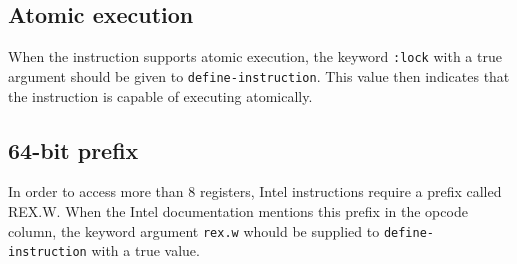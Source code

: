 \subsection{Atomic execution}

When the instruction supports atomic execution, the keyword
\texttt{:lock} with a true argument should be given to
\texttt{define-instruction}.  This value then indicates that the
instruction is capable of executing atomically.

\subsection{64-bit prefix}

In order to access more than 8 registers, Intel instructions require a
prefix called REX.W.  When the Intel documentation mentions this
prefix in the opcode column, the keyword argument \texttt{rex.w}
whould be supplied to \texttt{define-instruction} with a true value.
